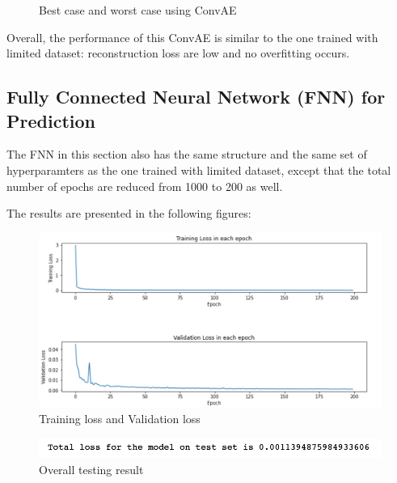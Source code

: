 \begin{figure}[H]
\caption{Best case and worst case using ConvAE}
\label{fig:figures}
\end{figure}

Overall, the performance of this ConvAE is similar to the one trained with limited dataset: reconstruction loss are low and no overfitting occurs.


\subsection{Fully Connected Neural Network (FNN) for Prediction}

The FNN in this section also has the same structure and the same set of hyperparamters as the one trained with limited dataset, except that the total number of epochs are reduced from 1000 to 200 as well.

The results are presented in the following figures:

\begin{figure}[H]
    \caption{Training loss and Validation loss}
    \includegraphics[scale=0.6]{figures/mantle_convection_images/larger_dataset/FNN_trainingData.png}
\end{figure}

\begin{figure}[H]
    \caption{Overall testing result}
    \includegraphics[scale=0.8]{figures/mantle_convection_images/larger_dataset/FNN_OverallTesting.png}
\end{figure}

